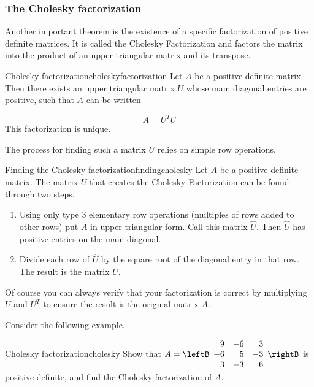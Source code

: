 \subsubsection{The Cholesky factorization}

Another important theorem is the existence of a specific factorization of positive definite matrices. It is called the Cholesky Factorization and factors the matrix into the product of an upper triangular matrix and its transpose.

\begin{theorem}{Cholesky factorization}{choleskyfactorization}
Let $A$ be a positive definite matrix. Then
there exists an upper triangular matrix $U$ whose main diagonal entries are positive, such that $A$ can be written

\begin{equation*}
A=
U^TU
\end{equation*}
This factorization is unique.
\end{theorem}

The process for finding such a matrix $U$ relies on simple row operations.

\begin{procedure}{Finding the Cholesky factorization}{findingcholesky}
Let $A$ be a positive definite matrix. The matrix $U$ that creates the Cholesky Factorization can be found through two steps.
\begin{enumerate}
\item Using only type $3$ elementary row operations (multiples of rows added to other rows) put $A$ in upper triangular form. Call this matrix $\hat{U}$. Then $\hat{U}$ has positive entries on the main diagonal. 
\item Divide each row of $\hat{U}$ by the square root of the diagonal entry in that row. The result is the matrix $U$. 
\end{enumerate}
\end{procedure}

Of course you can always verify that your factorization is correct by multiplying $U$ and $U^T$ to ensure the result is the original matrix $A$. 

Consider the following example.

\begin{example}{Cholesky factorization}{cholesky}
Show that
$A=\leftB\begin{array}{rrr}
9 & -6 & 3 \\ -6 & 5 & -3 \\ 3 & -3 & 6 
\end{array}\rightB$ 
is positive definite, and find the Cholesky factorization of $A$.
\end{example}

